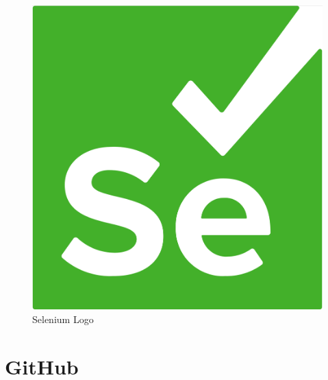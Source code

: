 \begin{figure}[H]
 \begin{center}
  \includegraphics[scale=0.25]{img/seleniumlogo.png}
  \end{center}
  \caption{Selenium Logo}
  \label{fig: Image of Selenium Logo}
\end{figure}

\section{GitHub}

